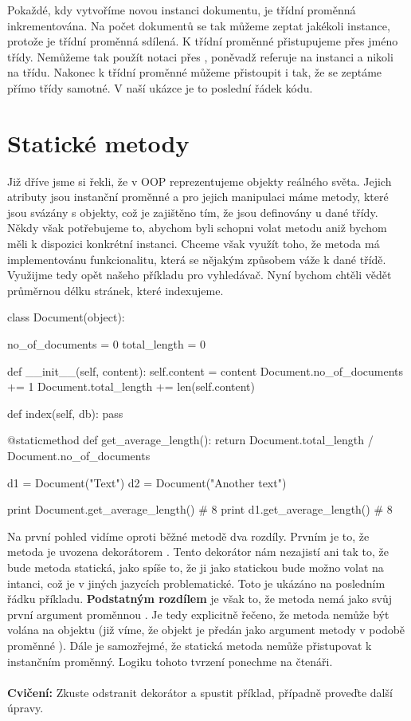 Pokaždé, kdy vytvoříme novou instanci dokumentu, je třídní proměnná  inkrementována.
Na počet dokumentů se tak můžeme zeptat jakékoli instance, protože je třídní proměnná sdílená.
K třídní proměnné přistupujeme přes jméno třídy. Nemůžeme tak použít notaci přes ,
poněvadž  referuje na instanci a nikoli na třídu.
Nakonec k třídní proměnné můžeme přistoupit i tak, že se zeptáme přímo třídy samotné.
V naší ukázce je to poslední řádek kódu.

\section{Statické metody}

Již dříve jsme si řekli, že v OOP reprezentujeme objekty reálného světa. Jejich atributy jsou instanční
proměnné a pro jejich manipulaci máme metody, které jsou svázány s objekty, což je zajištěno tím, že
jsou definovány u dané třídy. Někdy však potřebujeme to, abychom byli schopni volat metodu aniž bychom
měli k dispozici konkrétní instanci. Chceme však využít toho, že metoda má implementovánu funkcionalitu,
která se nějakým způsobem váže k dané třídě. Využijme tedy opět našeho příkladu pro vyhledávač.
Nyní bychom chtěli vědět průměrnou délku stránek, které indexujeme.

\begin{python}
class Document(object):
    
    no_of_documents = 0
    total_length = 0

    def __init__(self, content):
        self.content = content
        Document.no_of_documents += 1
        Document.total_length += len(self.content)

    def index(self, db):
        pass

    @staticmethod
    def get_average_length():
        return Document.total_length / Document.no_of_documents

d1 = Document("Text")
d2 = Document("Another text")

print Document.get_average_length() # 8
print d1.get_average_length() # 8
\end{python}

Na první pohled vidíme oproti běžné metodě dva rozdíly. Prvním je to, že metoda je uvozena
dekorátorem . Tento dekorátor nám nezajistí ani tak
to, že bude metoda statická, jako spíše to, že ji jako statickou bude možno volat na intanci, což je
v jiných jazycích problematické. Toto je ukázáno na posledním řádku příkladu.
\textbf{Podstatným rozdílem} je však to, že metoda nemá jako svůj první
argument proměnnou . Je tedy explicitně řečeno, že metoda nemůže být volána na objektu (již
víme, že objekt je předán jako argument metody v podobě proměnné ). Dále je samozřejmé, že
statická metoda nemůže přistupovat k instančním proměnný. Logiku tohoto tvrzení ponechme na čtenáři.
\\
\\
\noindent
{\textbf{Cvičení:}}
Zkuste odstranit dekorátor a spustit příklad, případně proveďte další úpravy.


